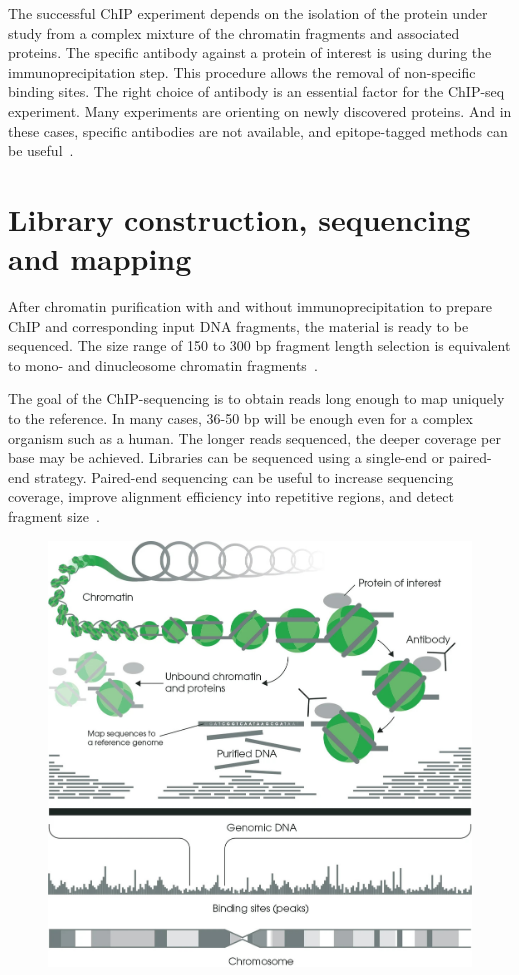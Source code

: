 The successful ChIP experiment depends on the isolation of the protein under study from a complex mixture of the chromatin fragments and associated proteins. 
The specific antibody against a protein of interest is using during the immunoprecipitation step. 
This procedure allows the removal of non-specific binding sites. 
The right choice of antibody is an essential factor for the ChIP-seq experiment. 
Many experiments are orienting on newly discovered proteins. 
And in these cases, specific antibodies are not available, and epitope-tagged methods can be useful~\cite{brizzard2008epitope, goldberg2010distinct}.

\section{Library construction, sequencing and mapping}

After chromatin purification with and without immunoprecipitation to prepare ChIP and corresponding input DNA fragments, the material is ready to be sequenced. 
The size range of 150 to 300 bp fragment length selection is equivalent to mono- and dinucleosome chromatin fragments~\cite{kidder2011chip}.

The goal of the ChIP-sequencing is to obtain reads long enough to map uniquely to the reference.  
In many cases, 36-50 bp will be enough even for a complex organism such as a human. 
The longer reads sequenced, the deeper coverage per base may be achieved.
Libraries can be sequenced using a single-end or paired-end strategy. 
Paired-end sequencing can be useful to increase sequencing coverage, improve alignment efficiency into repetitive regions, and detect fragment size~\cite{kidder2011chip, chen2012systematic}.


\begin{figure}[b!]
\centering
\includegraphics[width=\textwidth]{../img/chip.jpeg}
\label{fig:graph_classes}
\end{figure}

